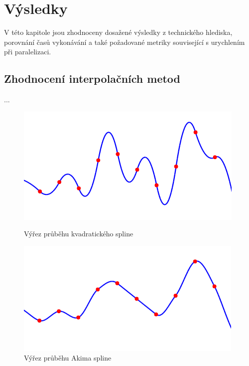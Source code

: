 \documentclass[]{thesiskiv}
\begin{document}
\chapter{Výsledky}

V této kapitole jsou zhodnoceny dosažené výsledky z technického hlediska, porovnání časů vykonávání a také požadované metriky související s urychlením při paralelizaci.

\section{Zhodnocení interpolačních metod}

...

\begin{figure}
\centering
\captionsetup{width=1.0\textwidth}
\begin{minipage}[ht]{0.65\textwidth}
	\includegraphics[width=\linewidth]{img/sample-quad.png}
	\caption{Výřez průběhu kvadratického spline}
\end{minipage}

\begin{minipage}[ht]{0.65\textwidth}
	\includegraphics[width=\linewidth]{img/sample-akima.png}
	\caption{Výřez průběhu Akima spline}
\end{minipage}


\end{figure}
\end{document}
